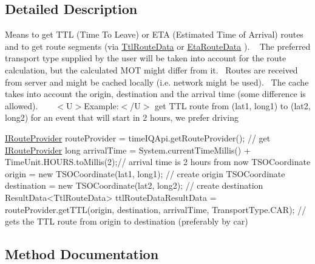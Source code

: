 \subsection{Detailed Description}
Means to get T\+T\+L (Time To Leave) or E\+T\+A (Estimated Time of Arrival) routes and to get route segments (via \hyperlink{interface_ttl_route_data}{Ttl\+Route\+Data} or \hyperlink{interface_eta_route_data}{Eta\+Route\+Data} ). ~\newline
 The preferred transport type supplied by the user will be taken into account for the route calculation, but the calculated M\+O\+T might differ from it.~\newline
 Routes are received from server and might be cached locally (i.\+e. network might be used).~\newline
 The cache takes into account the origin, destination and the arrival time (some difference is allowed). ~\newline
 ~\newline
 $<$\+U$>$Example\+:$<$/\+U$>$ get T\+T\+L route from (lat1, long1) to (lat2, long2) for an event that will start in 2 hours, we prefer driving ~\newline
 ~\newline
 


\begin{DoxyPre} {\ttfamily \hyperlink{protocol_i_route_provider-p}{IRouteProvider} routeProvider = timeIQApi.getRouteProvider(); // get \hyperlink{protocol_i_route_provider-p}{IRouteProvider} long arrivalTime = System.currentTimeMillis() + TimeUnit.HOURS.toMillis(2);// arrival time is 2 hours from now TSOCoordinate origin = new TSOCoordinate(lat1, long1); // create origin TSOCoordinate destination = new TSOCoordinate(lat2, long2); // create destination ResultData<TtlRouteData> ttlRouteDataResultData = routeProvider.getTTL(origin, destination, arrivalTime, TransportType.CAR); // gets the TTL route from origin to destination (preferably by car)} \end{DoxyPre}
 

\subsection{Method Documentation}
\hypertarget{protocol_i_route_provider-p_a0046766facf8401163ef3358a513d899}{}
